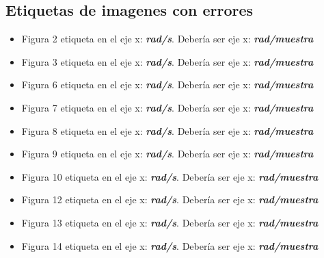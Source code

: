 \subsection{Etiquetas de imagenes con errores}
\begin{itemize}
    \item Figura 2 etiqueta en el eje x: \textbf{\textit{rad/s}}. Debería ser eje x: \textbf{\textit{rad/muestra}}
    \item Figura 3 etiqueta en el eje x: \textbf{\textit{rad/s}}. Debería ser eje x: \textbf{\textit{rad/muestra}}
    \item Figura 6 etiqueta en el eje x: \textbf{\textit{rad/s}}. Debería ser eje x: \textbf{\textit{rad/muestra}}
    \item Figura 7 etiqueta en el eje x: \textbf{\textit{rad/s}}. Debería ser eje x: \textbf{\textit{rad/muestra}}
    \item Figura 8 etiqueta en el eje x: \textbf{\textit{rad/s}}. Debería ser eje x: \textbf{\textit{rad/muestra}}
    \item Figura 9 etiqueta en el eje x: \textbf{\textit{rad/s}}. Debería ser eje x: \textbf{\textit{rad/muestra}}
    \item Figura 10 etiqueta en el eje x: \textbf{\textit{rad/s}}. Debería ser eje x: \textbf{\textit{rad/muestra}}
    \item Figura 12 etiqueta en el eje x: \textbf{\textit{rad/s}}. Debería ser eje x: \textbf{\textit{rad/muestra}}
    \item Figura 13 etiqueta en el eje x: \textbf{\textit{rad/s}}. Debería ser eje x: \textbf{\textit{rad/muestra}}
    \item Figura 14 etiqueta en el eje x: \textbf{\textit{rad/s}}. Debería ser eje x: \textbf{\textit{rad/muestra}}
     
\end{itemize}
